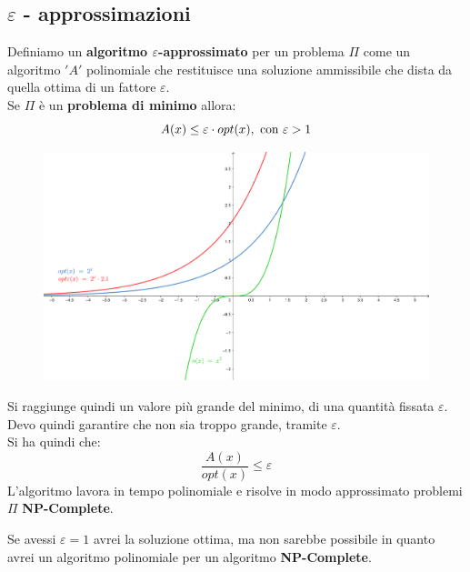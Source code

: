 							\subsection{$\varepsilon$ - approssimazioni}
							\begin{definizione}
								Definiamo un \textbf{algoritmo $\varepsilon$-approssimato} per un problema
								$\Pi$ come un 
								algoritmo $ 'A' $ polinomiale che restituisce una soluzione ammissibile che dista
								da quella ottima di un fattore $\varepsilon$.\\
								Se $\Pi$ è un \textbf{problema di minimo} allora:
								\[A(x)\leq \varepsilon\cdot opt(x), \mbox{ \textnormal{con} }\varepsilon>1\]
								\begin{figure}[H]
									\centering
									\includegraphics[width=1\textwidth]{img/epsilon1.png}
								\end{figure}
							\end{definizione}
							Si raggiunge quindi un valore più grande del minimo, di una quantità fissata
							$\varepsilon$. Devo quindi garantire che non sia troppo grande, tramite
							$\varepsilon$.\\
							Si ha quindi che:
							\[\frac{A(x)}{opt(x)}\leq \varepsilon\]
							L'algoritmo lavora in tempo polinomiale e risolve in modo approssimato
							problemi $\Pi$ \textbf{NP-Complete}.
							\begin{nota}
								Se avessi $\varepsilon=1$ avrei la
								soluzione ottima, ma non sarebbe possibile in quanto avrei un algoritmo
								polinomiale per un algoritmo \textbf{NP-Complete}.
							\end{nota}
